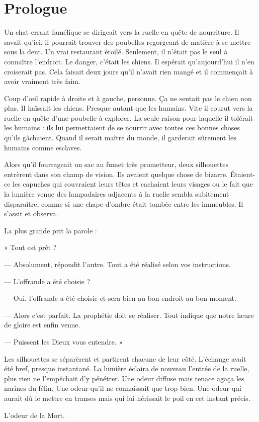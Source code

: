 \chapter[Prologue]{Prologue}
Un chat errant famélique se dirigeait vers la ruelle en quête de nourriture. Il savait qu'ici, il pourrait trouver des 
poubelles regorgeant de matière à se mettre sous la dent. Un vrai restaurant étoilé. Seulement, il n'était pas le 
seul à connaître l'endroit. Le danger, c'était les chiens. Il espérait qu'aujourd'hui il n'en croiserait pas. Cela 
faisait deux jours qu'il n'avait rien mangé et il commençait à avoir vraiment très faim.

Coup d'œil rapide à droite et à gauche, personne. Ça ne sentait pas le chien non plus. Il haïssait les chiens. 
Presque autant que les humains. Vite il courut  vers la ruelle en quête d'une poubelle à explorer. La seule raison 
pour laquelle il tolérait les humains : ils lui permettaient de se nourrir avec toutes ces bonnes choses qu'ils 
gâchaient. Quand il serait maître du monde, il garderait sûrement les humains comme esclaves. 

Alors qu'il fourrageait un sac au fumet très prometteur, deux silhouettes entrèrent dans son champ de vision. Ils 
avaient quelque chose de bizarre. Étaient-ce les capuches qui couvraient leurs têtes et cachaient leurs visages ou
 le fait que la lumière venue des lampadaires adjacents à la ruelle sembla subitement disparaître, comme si une chape 
d'ombre était tombée entre les immeubles. Il s'assit et observa.

La plus grande prit la parole :

« Tout est prêt ?

— Absolument, répondit l'autre. Tout a été réalisé selon vos instructions.

— L'offrande a été choisie ?

— Oui, l'offrande a été choisie et sera bien au bon endroit au bon moment. 

— Alors c'est parfait. La prophétie doit se réaliser. Tout indique que notre heure de gloire est enfin venue. 

— Puissent les Dieux vous entendre. »

Les silhouettes se séparèrent et partirent chacune de leur côté. L'é\-change avait été bref, presque instantané. La 
lumière éclaira de nouveau l'entrée de la ruelle, plus rien ne l'empêchait d'y pénétrer. Une odeur diffuse mais tenace 
agaça les narines du félin. Une odeur qu'il ne connaissait que trop bien. Une odeur qui aurait dû le mettre en transes 
mais qui lui hérissait le poil en cet instant précis.

L'odeur de la Mort.
